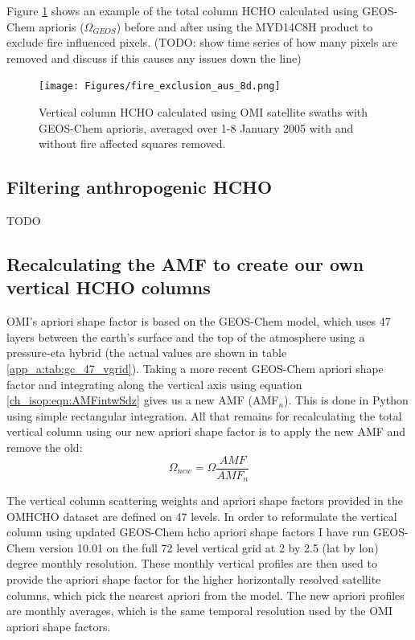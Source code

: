     Figure \ref{ch_isop:fig:fireexclusionexample} shows an example of the total column HCHO calculated using GEOS-Chem aprioris ($\Omega_{GEOS}$) before and after using the MYD14C8H product to exclude fire influenced pixels.
    (TODO: show time series of how many pixels are removed and discuss if this causes any issues down the line)
    
    \begin{figure}[!htbp]\begin{center}
      \texttt{[image: Figures/fire\_exclusion\_aus\_8d.png]}
      \caption{Vertical column HCHO calculated using OMI satellite swaths with GEOS-Chem aprioris, averaged over 1-8 January 2005 with and without fire affected squares removed.}
      \label{ch_isop:fig:fireexclusionexample}
    \end{center}\end{figure}
    
  \subsection{Filtering anthropogenic HCHO}
    TODO
  
  \subsection{Recalculating the AMF to create our own vertical HCHO columns}
  \label{ch_isop:sec:recalculating_AMF_description}
    OMI's apriori shape factor is based on the GEOS-Chem model, which uses 47 layers between the earth's surface and the top of the atmosphere using a pressure-eta hybrid (the actual values are shown in table \ref{app_a:tab:gc_47_vgrid}).
    Taking a more recent GEOS-Chem apriori shape factor and integrating along the vertical axis using equation \ref{ch_isop:eqn:AMFintwSdz} gives us a new AMF (AMF$_n$).
    This is done in Python using simple rectangular integration.
    All that remains for recalculating the total vertical column using our new apriori shape factor is to apply the new AMF and remove the old:
    \begin{equation*}
      \Omega_{new} = \Omega \frac{AMF}{AMF_n} 
    \end{equation*}
    
    The vertical column scattering weights and apriori shape factors provided in the OMHCHO dataset are defined on 47 levels.
    In order to reformulate the vertical column using updated GEOS-Chem hcho apriori shape factors I have run GEOS-Chem version 10.01 on the full 72 level vertical grid at 2 by 2.5 (lat by lon) degree monthly resolution. 
    These monthly vertical profiles are then used to provide the apriori shape factor for the higher horizontally resolved satellite columns, which pick the nearest apriori from the model.
    The new apriori profiles are monthly averages, which is the same temporal resolution used by the OMI apriori shape factors.
    
